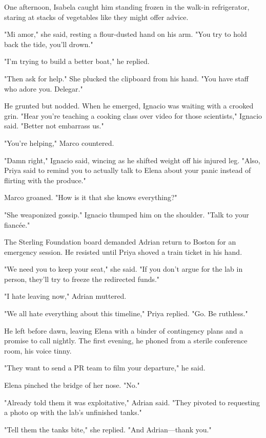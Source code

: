 One afternoon, Isabela caught him standing frozen in the walk-in refrigerator, staring at stacks of vegetables like they might offer advice.

"Mi amor," she said, resting a flour-dusted hand on his arm. "You try to hold back the tide, you'll drown."

"I'm trying to build a better boat," he replied.

"Then ask for help." She plucked the clipboard from his hand. "You have staff who adore you. Delegar."

He grunted but nodded. When he emerged, Ignacio was waiting with a crooked grin. "Hear you're teaching a cooking class over video for those scientists," Ignacio said. "Better not embarrass us."

"You're helping," Marco countered.

"Damn right," Ignacio said, wincing as he shifted weight off his injured leg. "Also, Priya said to remind you to actually talk to Elena about your panic instead of flirting with the produce."

Marco groaned. "How is it that she knows everything?"

"She weaponized gossip." Ignacio thumped him on the shoulder. "Talk to your fiancée."

\bigskip

The Sterling Foundation board demanded Adrian return to Boston for an emergency session. He resisted until Priya shoved a train ticket in his hand.

"We need you to keep your seat," she said. "If you don't argue for the lab in person, they'll try to freeze the redirected funds."

"I hate leaving now," Adrian muttered.

"We all hate everything about this timeline," Priya replied. "Go. Be ruthless."

He left before dawn, leaving Elena with a binder of contingency plans and a promise to call nightly. The first evening, he phoned from a sterile conference room, his voice tinny.

"They want to send a PR team to film your departure," he said.

Elena pinched the bridge of her nose. "No."

"Already told them it was exploitative," Adrian said. "They pivoted to requesting a photo op with the lab's unfinished tanks."

"Tell them the tanks bite," she replied. "And Adrian—thank you."

